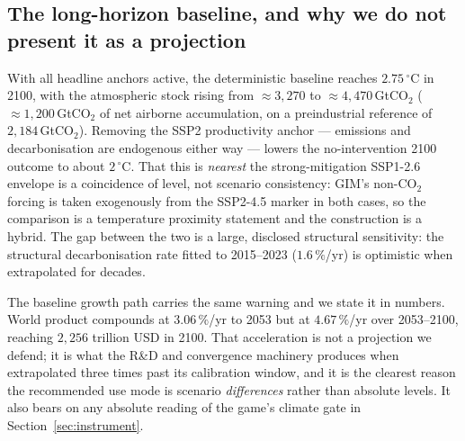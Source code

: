 \documentclass[12pt,a4paper]{article}
\newcommand{\degC}{$^{\circ}$C}
\begin{document}
\subsection{The long-horizon baseline, and why we do not present it as a projection}

With all headline anchors active, the deterministic baseline reaches $2.75$\,\degC{} in 2100,
with the atmospheric stock rising from ${\approx}3{,}270$ to ${\approx}4{,}470$\,GtCO$_2$
(${\approx}1{,}200$\,GtCO$_2$ of net airborne accumulation, on a preindustrial reference of
$2{,}184$\,GtCO$_2$). Removing the SSP2 productivity anchor --- emissions and decarbonisation
are endogenous either way --- lowers the no-intervention 2100 outcome to about $2$\,\degC. That
this is \emph{nearest} the strong-mitigation SSP1-2.6 envelope is a coincidence of level, not
scenario consistency: GIM's non-CO$_2$ forcing is taken exogenously from the SSP2-4.5 marker
\citep{meinshausen2020} in both cases, so the comparison is a temperature proximity statement
and the construction is a hybrid. The gap between the two is a large, disclosed structural
sensitivity: the structural decarbonisation rate fitted to 2015--2023 ($1.6\,\%$/yr) is
optimistic when extrapolated for decades.

The baseline growth path carries the same warning and we state it in numbers. World product
compounds at $3.06\,\%$/yr to 2053 but at $4.67\,\%$/yr over 2053--2100, reaching
$2{,}256$ trillion USD in 2100. That acceleration is not a projection we defend; it is what
the R\&D and convergence machinery produces when extrapolated three times past its calibration
window, and it is the clearest reason the recommended use mode is scenario \emph{differences}
rather than absolute levels. It also bears on any absolute reading of the game's climate gate
in Section~\ref{sec:instrument}.
\end{document}
